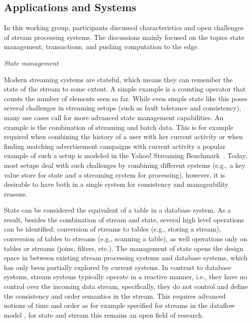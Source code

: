 \subsection{Applications and Systems}

In this working group, participants discussed characteristics and open 
challenges of stream processing systems. The discussions mainly focused on 
the topics state management, transactions, and pushing computation to the edge.

\emph{State management}

Modern streaming systems are stateful, which means they can remember the state 
of the stream to some extent. A simple example is a counting operator that 
counts the number of elements seen so far. While even simple state like this 
poses several challenges in streaming setups (such as fault tolerance and 
consistency), many use cases call for more advanced state management 
capabilities. An example is the combination of streaming and batch data. This
is for example required when combining the history of a user with her current
activity or when finding matching advertisement campaigns with current activity
a popular example of such a setup is modeled in the Yahoo! Streaming 
Benchmark~\cite{Chintapalli2016BenchmarkingSC}. Today, most setups deal with
such challenges by combining different systems (e.g., a key value store for
state and a streaming system for processing), however, it is desirable to have 
both in a single system for consistency and manageability reasons. 

State can be considered the equivalent of a table in a database system. As a 
result, besides the combination of stream and state, several high level
operations can be identified: conversion of streams to tables (e.g., storing 
a stream), conversion of tables to streams (e.g., scanning a table), as well 
operations only on tables or streams (joins, filters, etc.). The management of 
state opens the design space in between existing stream processing systems and 
database systems, which has only been partially explored by current systems.
In contrast to database systems, stream systems typically operate in a reactive
manner, i.e., they have no control over the incoming data stream, specifically, 
they do not control and define the consistency and order semantics in the 
stream. This requires advanced notions of time and order as for example 
specified for streams in the dataflow model \cite{43864}, for state and stream
this remains an open field of research. 


